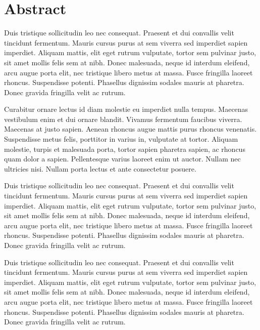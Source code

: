 % 


\chapter{Abstract} %
\noindent
Duis tristique sollicitudin leo nec consequat. Praesent et dui convallis velit tincidunt fermentum. Mauris cursus purus at sem viverra sed imperdiet sapien imperdiet. Aliquam mattis, elit eget rutrum vulputate, tortor sem pulvinar justo, sit amet mollis felis sem at nibh. Donec malesuada, neque id interdum eleifend, arcu augue porta elit, nec tristique libero metus at massa. Fusce fringilla laoreet rhoncus. Suspendisse potenti. Phasellus dignissim sodales mauris at pharetra. Donec gravida fringilla velit ac rutrum.

Curabitur ornare lectus id diam molestie eu imperdiet nulla tempus. Maecenas vestibulum enim et dui ornare blandit. Vivamus fermentum faucibus viverra. Maecenas at justo sapien. Aenean rhoncus augue mattis purus rhoncus venenatis. Suspendisse metus felis, porttitor in varius in, vulputate at tortor. Aliquam molestie, turpis et malesuada porta, tortor sapien pharetra sapien, ac rhoncus quam dolor a sapien. Pellentesque varius laoreet enim ut auctor. Nullam nec ultricies nisi. Nullam porta lectus et ante consectetur posuere.

Duis tristique sollicitudin leo nec consequat. Praesent et dui convallis velit tincidunt fermentum. Mauris cursus purus at sem viverra sed imperdiet sapien imperdiet. Aliquam mattis, elit eget rutrum vulputate, tortor sem pulvinar justo, sit amet mollis felis sem at nibh. Donec malesuada, neque id interdum eleifend, arcu augue porta elit, nec tristique libero metus at massa. Fusce fringilla laoreet rhoncus. Suspendisse potenti. Phasellus dignissim sodales mauris at pharetra. Donec gravida fringilla velit ac rutrum.

Duis tristique sollicitudin leo nec consequat. Praesent et dui convallis velit tincidunt fermentum. Mauris cursus purus at sem viverra sed imperdiet sapien imperdiet. Aliquam mattis, elit eget rutrum vulputate, tortor sem pulvinar justo, sit amet mollis felis sem at nibh. Donec malesuada, neque id interdum eleifend, arcu augue porta elit, nec tristique libero metus at massa. Fusce fringilla laoreet rhoncus. Suspendisse potenti. Phasellus dignissim sodales mauris at pharetra. Donec gravida fringilla velit ac rutrum.

